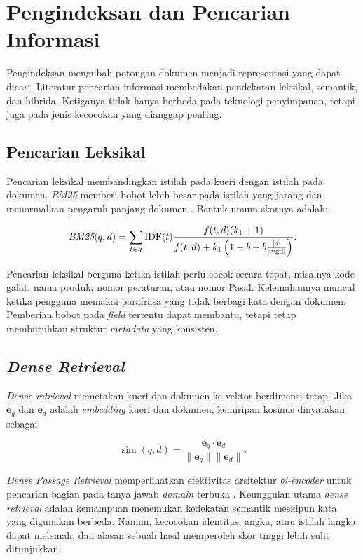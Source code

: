 \section{Pengindeksan dan Pencarian Informasi}

Pengindeksan mengubah potongan dokumen menjadi representasi yang dapat dicari. Literatur pencarian informasi membedakan pendekatan leksikal, semantik, dan hibrida. Ketiganya tidak hanya berbeda pada teknologi penyimpanan, tetapi juga pada jenis kecocokan yang dianggap penting.

\subsection{Pencarian Leksikal}

Pencarian leksikal membandingkan istilah pada kueri dengan istilah pada dokumen. \emph{BM25} memberi bobot lebih besar pada istilah yang jarang dan menormalkan pengaruh panjang dokumen \parencite{robertsonProbabilisticRelevanceFramework2009}. Bentuk umum skornya adalah:

\begin{equation}
\operatorname{\emph{BM25}}(q,d)=
\sum_{t\in q}\operatorname{IDF}(t)
\frac{f(t,d)(k_1+1)}
{f(t,d)+k_1\left(1-b+b\frac{|d|}{\operatorname{avgdl}}\right)}.
\end{equation}

Pencarian leksikal berguna ketika istilah perlu cocok secara tepat, misalnya kode galat, nama produk, nomor peraturan, atau nomor Pasal. Kelemahannya muncul ketika pengguna memakai parafrasa yang tidak berbagi kata dengan dokumen. Pemberian bobot pada \emph{field} tertentu dapat membantu, tetapi tetap membutuhkan struktur \emph{metadata} yang konsisten.

\subsection{\emph{Dense Retrieval}}

\emph{Dense retrieval} memetakan kueri dan dokumen ke vektor berdimensi tetap. Jika $\mathbf{e}_q$ dan $\mathbf{e}_d$ adalah \emph{embedding} kueri dan dokumen, kemiripan kosinus dinyatakan sebagai:

\begin{equation}
    \operatorname{sim}(q,d)=
    \frac{\mathbf{e}_q\cdot\mathbf{e}_d}
    {\lVert\mathbf{e}_q\rVert\lVert\mathbf{e}_d\rVert}.
\end{equation}

\emph{Dense Passage Retrieval} memperlihatkan efektivitas arsitektur \emph{bi-encoder} untuk pencarian bagian pada tanya jawab \emph{domain} terbuka \parencite{karpukhinDensePassageRetrieval2020}. Keunggulan utama \emph{dense retrieval} adalah kemampuan menemukan kedekatan semantik meskipun kata yang digunakan berbeda. Namun, kecocokan identitas, angka, atau istilah langka dapat melemah, dan alasan sebuah hasil memperoleh skor tinggi lebih sulit ditunjukkan.

